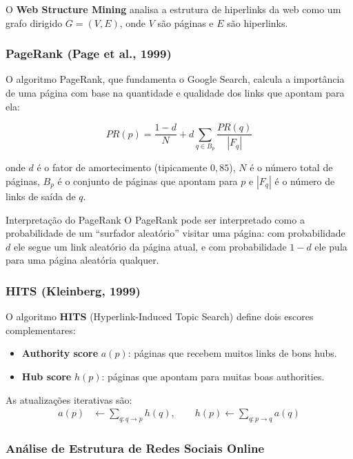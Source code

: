 \documentclass[12pt,a4paper]{article}
\begin{document}
O \textbf{Web Structure Mining} analisa a estrutura de hiperlinks da web como um grafo dirigido $G = (V, E)$, onde $V$ são páginas e $E$ são hiperlinks.

\subsubsection{PageRank (Page et al., 1999)}

O algoritmo PageRank, que fundamenta o Google Search, calcula a importância de uma página com base na quantidade e qualidade dos links que apontam para ela:

\begin{equation}
  PR(p) = \frac{1-d}{N} + d \sum_{q \in B_p} \frac{PR(q)}{|F_q|}
\end{equation}

onde $d$ é o fator de amortecimento (tipicamente $0{,}85$), $N$ é o número total de páginas, $B_p$ é o conjunto de páginas que apontam para $p$ e $|F_q|$ é o número de links de saída de $q$.

\begin{dicabox}{Interpretação do PageRank}
O PageRank pode ser interpretado como a probabilidade de um ``surfador aleatório'' visitar uma página: com probabilidade $d$ ele segue um link aleatório da página atual, e com probabilidade $1-d$ ele pula para uma página aleatória qualquer.
\end{dicabox}

\subsubsection{HITS (Kleinberg, 1999)}

O algoritmo \textbf{HITS} (Hyperlink-Induced Topic Search) define dois escores complementares:
\begin{itemize}
  \item \textbf{Authority score} $a(p)$: páginas que recebem muitos links de bons hubs.
  \item \textbf{Hub score} $h(p)$: páginas que apontam para muitas boas authorities.
\end{itemize}

As atualizações iterativas são:
\begin{align}
  a(p) &\leftarrow \sum_{q: q \to p} h(q), \qquad h(p) \leftarrow \sum_{q: p \to q} a(q)
\end{align}

\subsubsection{Análise de Estrutura de Redes Sociais Online}
\end{document}
